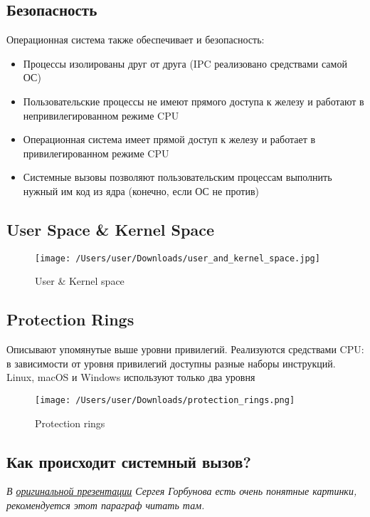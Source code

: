   \subsection{Безопасность}
    Операционная система также обеспечивает и безопасность:
    \begin{itemize}
      \item Процессы изолированы друг от друга (IPC реализовано средствами самой ОС)
      \item Пользовательские процессы не имеют прямого доступа к железу и работают в непривилегированном режиме CPU
      \item Операционная система имеет прямой доступ к железу и работает в привилегированном режиме CPU
      \item Системные вызовы позволяют пользовательским процессам выполнить нужный им код из ядра (конечно, если ОС не против)
    \end{itemize}
  
  \subsection{User Space \& Kernel Space}
  
\begin{figure}[H]
  \centering
  \texttt{[image: /Users/user/Downloads/user\_and\_kernel\_space.jpg]}
  \caption{User \& Kernel space}
  \label{fig:spaces}
\end{figure}
  
  \subsection{Protection Rings}
    Описывают упомянутые выше уровни привилегий. Реализуются средствами CPU: в зависимости от уровня привилегий доступны разные наборы инструкций. Linux, macOS и Windows используют только два уровня
\begin{figure}[H]
  \centering
  \texttt{[image: /Users/user/Downloads/protection\_rings.png]}
  \caption{Protection rings}
  \label{fig:rings}
\end{figure}
  
  \subsection{Как происходит системный вызов?}
    \textit{В \href{https://github.com/carzil/caos-2022/blob/master/lectures/10-syscalls-dynlibs/main.md}{оригинальной презентации} Сергея Горбунова есть очень понятные картинки, рекомендуется этот параграф читать там.}
